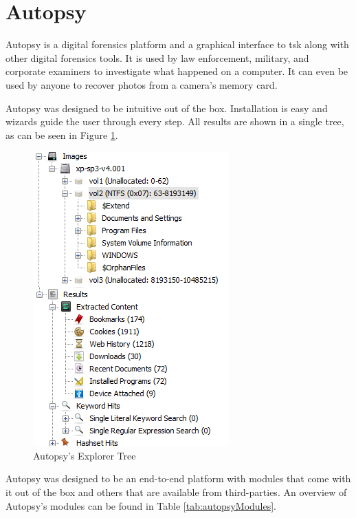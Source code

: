 \section{Autopsy}

Autopsy is a digital forensics platform and a graphical interface to \acrshort{tsk}
along with other digital forensics tools. It is used by law enforcement, military, 
and corporate examiners to investigate what happened on a computer. It can even 
be used by anyone to recover photos from a camera's memory card.

Autopsy was designed to be intuitive out of the box. Installation is easy and
wizards guide the user through every step. All results are shown in a single tree, as can be seen in Figure \ref{fig:tree}.

\begin{figure}[ht]
 \centering
 \includegraphics[width=0.5\linewidth]{imgs/tree.png}
 \caption{Autopsy's Explorer Tree}
 \label{fig:tree}
\end{figure}

Autopsy was designed to be an end-to-end platform with modules that come with
it out of the box and others that are available from third-parties. An overview of Autopsy's modules can be found in Table \ref{tab:autopsyModules}.

